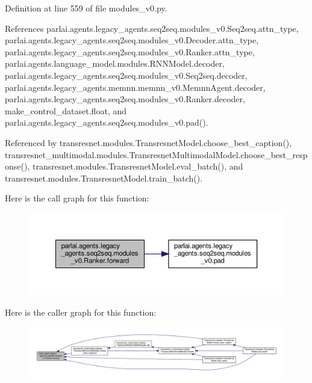 Definition at line 559 of file modules\+\_\+v0.\+py.



References parlai.\+agents.\+legacy\+\_\+agents.\+seq2seq.\+modules\+\_\+v0.\+Seq2seq.\+attn\+\_\+type, parlai.\+agents.\+legacy\+\_\+agents.\+seq2seq.\+modules\+\_\+v0.\+Decoder.\+attn\+\_\+type, parlai.\+agents.\+legacy\+\_\+agents.\+seq2seq.\+modules\+\_\+v0.\+Ranker.\+attn\+\_\+type, parlai.\+agents.\+language\+\_\+model.\+modules.\+R\+N\+N\+Model.\+decoder, parlai.\+agents.\+legacy\+\_\+agents.\+seq2seq.\+modules\+\_\+v0.\+Seq2seq.\+decoder, parlai.\+agents.\+legacy\+\_\+agents.\+memnn.\+memnn\+\_\+v0.\+Memnn\+Agent.\+decoder, parlai.\+agents.\+legacy\+\_\+agents.\+seq2seq.\+modules\+\_\+v0.\+Ranker.\+decoder, make\+\_\+control\+\_\+dataset.\+float, and parlai.\+agents.\+legacy\+\_\+agents.\+seq2seq.\+modules\+\_\+v0.\+pad().



Referenced by transresnet.\+modules.\+Transresnet\+Model.\+choose\+\_\+best\+\_\+caption(), transresnet\+\_\+multimodal.\+modules.\+Transresnet\+Multimodal\+Model.\+choose\+\_\+best\+\_\+response(), transresnet.\+modules.\+Transresnet\+Model.\+eval\+\_\+batch(), and transresnet.\+modules.\+Transresnet\+Model.\+train\+\_\+batch().

Here is the call graph for this function\+:
\nopagebreak
\begin{figure}[H]
\begin{center}
\leavevmode
\includegraphics[width=350pt]{classparlai_1_1agents_1_1legacy__agents_1_1seq2seq_1_1modules__v0_1_1Ranker_a48177b131d765ebd734d25f962c44f55_cgraph}
\end{center}
\end{figure}
Here is the caller graph for this function\+:
\nopagebreak
\begin{figure}[H]
\begin{center}
\leavevmode
\includegraphics[width=350pt]{classparlai_1_1agents_1_1legacy__agents_1_1seq2seq_1_1modules__v0_1_1Ranker_a48177b131d765ebd734d25f962c44f55_icgraph}
\end{center}
\end{figure}


